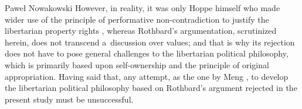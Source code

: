 \begin{artengenv}{Paweł Nowakowski}
However, in reality, it was only Hoppe himself who made wider use of the principle of performative non-contradiction to justify the libertarian property rights 
\parencites[see][]{Hoppe1988From}[][ch. 7]{Hoppe1989Theory}, %
 whereas Rothbard's argumentation, scrutinized herein, does not transcend a~discussion over values; and that is why its rejection does not have to pose general challenges to the libertarian political philosophy, which is primarily based upon self-ownership and the principle of original appropriation. Having said that, any attempt, as the one by Meng 
\parencite*[][]{Meng2002Hoppeing}, %
 to develop the libertarian political philosophy based on Rothbard's argument rejected in the present study must be unsuccessful.




\end{artengenv}

\label{nowakowski-last}